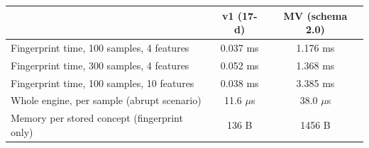 \renewcommand{\arraystretch}{1.25}\begin{tabular}{@{}lcc@{}}\toprule
& \textbf{v1 (17-d)} & \textbf{MV (schema 2.0)}\\\midrule
Fingerprint time, 100 samples, 4 features & 0.037 ms & 1.176 ms\\
Fingerprint time, 300 samples, 4 features & 0.052 ms & 1.368 ms\\
Fingerprint time, 100 samples, 10 features & 0.038 ms & 3.385 ms\\
Whole engine, per sample (abrupt scenario) & 11.6 $\mu$s & 38.0 $\mu$s\\
Memory per stored concept (fingerprint only) & 136 B & 1456 B\\
\bottomrule\end{tabular}
